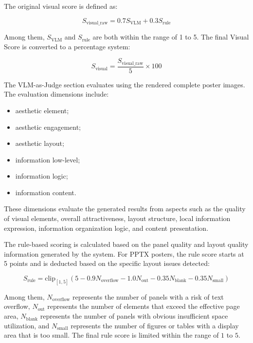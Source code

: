 \documentclass[12pt,oneside]{report}
\begin{document}
The original visual score is defined as:

\[
S_{\mathrm{visual\_raw}}
=
0.7S_{\mathrm{VLM}}
+
0.3S_{\mathrm{rule}}
\]

Among them, \(S_{\mathrm{VLM}}\) and \(S_{\mathrm{rule}}\) are both within the range of 1 to 5. The final Visual Score is converted to a percentage system:

\[
S_{\mathrm{visual}}
=
\frac{
S_{\mathrm{visual\_raw}}
}{5}
\times 100
\]

The VLM-as-Judge section evaluates using the rendered complete poster images. The evaluation dimensions include:

\begin{itemize}
    \item aesthetic element;
    \item aesthetic engagement;
    \item aesthetic layout;
    \item information low-level;
    \item information logic;
    \item information content.
\end{itemize}

These dimensions evaluate the generated results from aspects such as the quality of visual elements, overall attractiveness, layout structure, local information expression, information organization logic, and content presentation.

\vspace{1em}

The rule-based scoring is calculated based on the panel quality and layout quality information generated by the system. For PPTX posters, the rule score starts at 5 points and is deducted based on the specific layout issues detected:

\[
S_{\mathrm{rule}}
=
\mathrm{clip}_{[1,5]}
\left(
5
-0.9N_{\mathrm{overflow}}
-1.0N_{\mathrm{out}}
-0.35N_{\mathrm{blank}}
-0.35N_{\mathrm{small}}
\right)
\]

Among them, \(N_{\mathrm{overflow}}\) represents the number of panels with a risk of text overflow, \(N_{\mathrm{out}}\) represents the number of elements that exceed the effective page area, \(N_{\mathrm{blank}}\) represents the number of panels with obvious insufficient space utilization, and \(N_{\mathrm{small}}\) represents the number of figures or tables with a display area that is too small. The final rule score is limited within the range of \(1\) to \(5\).

\vspace{1em}
\end{document}
